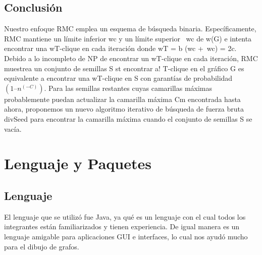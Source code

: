 \section{Conclusión}
Nuestro enfoque RMC emplea un esquema de búsqueda binaria. Específicamente, RMC mantiene un límite inferior wc y un límite superior ~wc de w(G) e intenta encontrar una wT-clique en cada iteración donde wT = b (wc +~wc) = 2c. Debido a lo incompleto de NP de encontrar un wT-clique en cada iteración, RMC muestrea un conjunto de semillas S st encontrar a! T-clique en el gráfico G es equivalente a encontrar una wT-clique en S con garantías de probabilidad \begin{math}(1 – n^(-C)) \end{math}. Para las semillas restantes cuyas camarillas máximas probablemente puedan actualizar la camarilla máxima Cm encontrada hasta ahora, proponemos un nuevo algoritmo iterativo de búsqueda de fuerza bruta divSeed para encontrar la camarilla máxima cuando el conjunto de semillas S se vacía.

\chapter{Lenguaje y Paquetes}
\section{Lenguaje}
El lenguaje que se utilizó fue Java, ya qué es un lenguaje con el cual todos los integrantes están familiarizados y tienen experiencia. De igual manera es un lenguaje amigable para aplicaciones GUI e interfaces, lo cual nos ayudó mucho para el dibujo de grafos.

